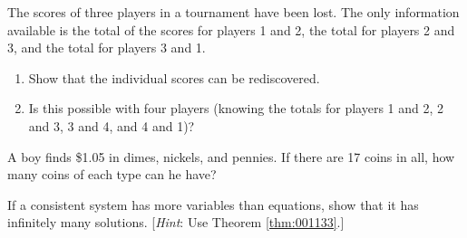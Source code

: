 \begin{multicols}{2}
\begin{ex}
The scores of three players in a tournament have been lost. The only information available is the total of the scores for players 1 and 2, the total for players 2 and 3, and the total for players 3 and 1.

\begin{enumerate}[label={\alph*.}]
\item Show that the individual scores can be rediscovered.

\item Is this possible with four players (knowing the totals for players 1 and 2, 2 and 3, 3 and 4, and 4 and 1)?

\end{enumerate}
\end{ex}

\begin{ex}
A boy finds \$1.05 in dimes, nickels, and pennies. If there are 17 coins in all, how many coins of each type can he have?
\end{ex}

\begin{ex}
If a consistent system has more variables than equations, show that it has infinitely many solutions. [\textit{Hint}: Use Theorem \ref{thm:001133}.]
\end{ex}
\end{multicols}

